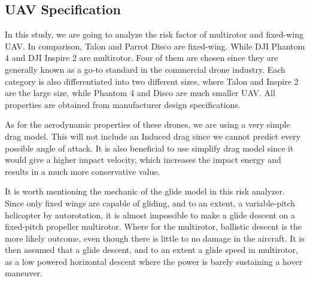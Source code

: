 \documentclass[12pt]{report}
\begin{document}
        \subsection{UAV Specification}
        In this study, we are going to analyze the risk factor of multirotor and fixed-wing UAV. In comparison, Talon
        and Parrot Disco are fixed-wing. While DJI Phantom 4 and DJI Inspire 2 are multirotor. Four of them are chosen
        since they are generally known as a go-to standard in the commercial drone industry. Each category is also
        differentiated into two different sizes, where Talon and Inspire 2 are the large size, while Phantom 4 and Disco
        are much smaller UAV. All properties are obtained from manufacturer design specifications.
            
        As for the aerodynamic properties of these drones, we are using a very simple drag model. This will not include
        an Induced drag since we cannot predict every possible angle of attack. It is also beneficial to use simplify
        drag model since it would give a higher impact velocity, which increases the impact energy and results in a much
        more conservative value.
            
        It is worth mentioning the mechanic of the glide model in this risk analyzer. Since only fixed wings are capable
        of gliding, and to an extent, a variable-pitch helicopter by autorotation, it is almost impossible to make a
        glide descent on a fixed-pitch propeller multirotor. Where for the multirotor, ballistic descent is the more
        likely outcome, even though there is little to no damage in the aircraft. It is then assumed that a glide
        descent, and to an extent a glide speed in multirotor, as a low powered horizontal descent where the power is
        barely sustaining a hover maneuver.
\end{document}
